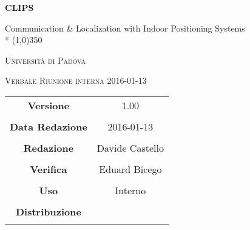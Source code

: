 \documentclass[a4paper,12pt]{article}
\author{Davide Castello}
\date{05/01/2013}
\begin{document}
\begin{titlepage}
	\centering
	{\huge\bfseries CLIPS\par}
	Communication \& Localization with Indoor Positioning Systems \\*
	\line(1,0){350} \\
	{\scshape\LARGE Università di Padova \par}
	\vspace{1cm}
	{\scshape\Large Verbale Riunione interna 2016-01-13 \par}
	\logo
	\newpage
	\begin{tabular}{c|c}
		{\hfill \textbf{Versione}} 			& 1.00				\\ \\
		{\hfill\textbf{Data Redazione}} 	& 2016-01-13  		\\ \\
		{\hfill\textbf{Redazione}} 			& Davide Castello	\\ \\
		{\hfill\textbf{Verifica}} 			& Eduard Bicego		\\ \\
		{\hfill\textbf{Uso}} 				& Interno			\\ \\
		{\hfill\textbf{Distribuzione}} 		& \leaf\			\\ \\
	\end{tabular}
\end{titlepage}
	
	\newpage

	
	\label{LastFrontPage}
	

	\newpage
	
	\pagestyle{mymain}
	
	
		

	
		
	
	
		
	
	
		
				
	\label{LastPage}
\end{document}
